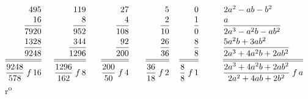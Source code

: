 $\begin{array}{rrrrrl} 
495 & \hspace{28pt} 119 & \hspace{31pt} 27 & \hspace{33pt} 5 & \hspace{20pt} 0 & \hspace{20pt} 2a^2 - ab - b^2 \\
%
16 & 8 & 4 & 2 & 1 & \hspace{20pt} a \\
%
\overline{7920\vphantom{l^{l}}} & \overline{952\vphantom{l^{l}}} & \overline{108\vphantom{l^{l}}} & \overline{10\vphantom{l^{l}}} & \overline{0\vphantom{l^{l}}} & \hspace{20pt} \overline{2a^3 - a^2b - ab^2\vphantom{l^{l}}} \\
%
1328 & 344 & 92 & 26 & 8 & \hspace{20pt} 5a^2b + 3ab^2\\
%
\overline{9248\vphantom{l^{l}}} & \overline{1296\vphantom{l^{l}}} & \overline{200\vphantom{l^{l}}} & \overline{36\vphantom{l^{l}}} & \overline{8\vphantom{l^{l}}} & \hspace{20pt} \overline{2a^3 + 4a^2b + 2ab^2\vphantom{l^{l}}}\\
%
    \overline{\overline{\displaystyle\frac{9248}{578}\; f\, 16\vphantom{\displaystyle\frac{l^{l}}{l^{l}}}}} & 
    \overline{\overline{\displaystyle\frac{1296}{162}\; f\, 8\vphantom{\displaystyle\frac{l^{l}}{l^{l}}}}} & 
    \overline{\overline{\displaystyle\frac{200}{50}\; f\, 4\vphantom{\displaystyle\frac{l^{l}}{l^{l}}}}} & 
    \overline{\overline{\displaystyle\frac{36}{18}\; f\, 2\vphantom{\displaystyle\frac{l^{l}}{l^{l}}}}} & 
    \overline{\overline{\displaystyle\frac{8}{8}\; f\, 1\vphantom{\displaystyle\frac{l^{l}}{l^{l}}}}} & \hspace{19pt} 
    \overline{\overline{\displaystyle\frac{2a^3 + 4a^2b + 2ab^2}{2a^2 + 4ab + 2b^2}\; f\,a\vphantom{\displaystyle\frac{l^{l}}{l^{l}}}}}
\end{array}$
\pend%
\vspace{2.5em}%
%
\pstart%
\noindent%
%
~r\textsuperscript{o}\rbrack\ %
%
%
